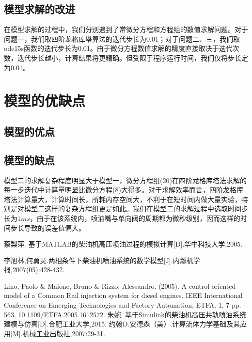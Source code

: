 \documentclass[withoutpreface,bwprint]{cumcmthesis} %
\begin{document}
			\subsection{模型求解的改进}
			
			在模型求解的过程中，我们分别遇到了常微分方程和方程组的数值求解问题。对于问题一，我们取四阶龙格库塔算法的迭代步长为0.01；对于问题二、三，我们取ode15s函数的迭代步长为0.01。由于微分方程数值求解的精度直接取决于迭代次数，迭代步长越小，计算结果将更精确。但受限于程序运行时间，我们仅将步长定为0.01。
			
			\section{模型的优缺点}
			\subsection{模型的优点}
			
			\subsection{模型的缺点}
			模型二的求解复杂程度明显大于模型一，微分方程组(20)在四阶龙格库塔法求解的每一步迭代中计算量明显比微分方程(8)大得多。对于求解效率而言，四阶龙格库塔法计算量大，计算时间长，所耗内存空间大，不利于在短时间内做大量实验，特别是对模型二这样的复杂方程组更是如此。我们在模型二的求解过程中选取时间步长为$1ms$，由于在该系统内，喷油嘴与单向阀的周期都为微秒级别，因而这样的时间步长导致的误差值偏大。
			
			
			\begin{thebibliography}{9}%
				 蔡梨萍. 基于MATLAB的柴油机高压喷油过程的模拟计算[D].华中科技大学,2005.
				
				李旭林,何勇灵.两相条件下柴油机喷油系统的数学模型[J].内燃机学报,2007(05):428-432.
				
				Lino, Paolo \& Maione, Bruno \& Rizzo, Alessandro. (2005). A control-oriented model of a Common Rail injection system for diesel engines. IEEE International Conference on Emerging Technologies and Factory Automation, ETFA. 1. 7 pp. - 563. 10.1109/ETFA.2005.1612572. 
				朱婉. 基于Simulink的柴油机高压共轨喷油系统建模与仿真[D].合肥工业大学,2015.
				约翰D.安德森（美）.计算流体力学基础及其应用[M].机械工业出版社,2007:29-31.
				
			\end{thebibliography}
			
\end{document}
